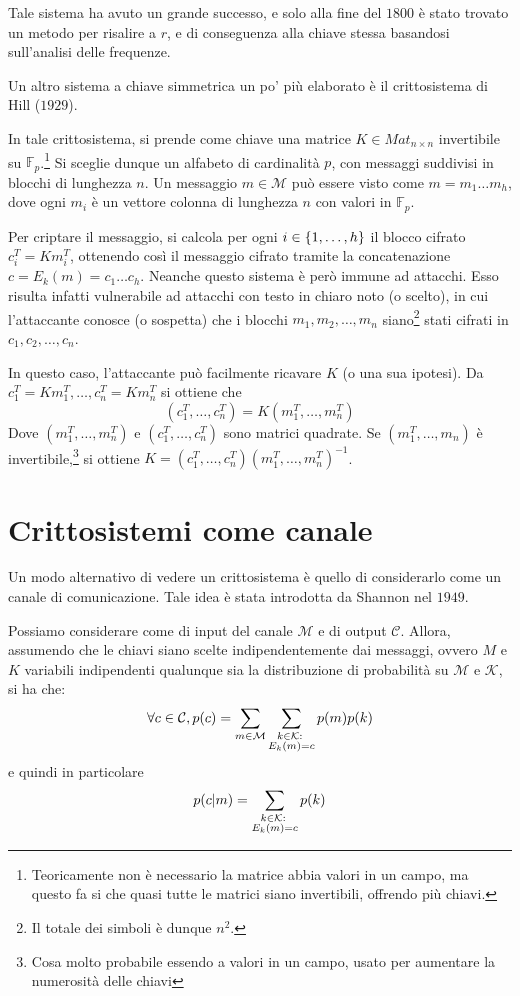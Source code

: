 Tale sistema ha avuto un grande successo, e solo alla fine del \(1800\) è stato trovato un metodo per risalire a \(r\), e di conseguenza alla chiave stessa basandosi sull'analisi delle frequenze.

Un altro sistema a chiave simmetrica un po' più elaborato è il crittosistema di Hill (\(1929\)).

In tale crittosistema, si prende come chiave una matrice \(K \in Mat_{n\times n}\) invertibile su \(\mathbb{F}_p\).\footnote{Teoricamente non è necessario la matrice abbia valori in un campo, ma questo fa si che quasi tutte le matrici siano invertibili, offrendo più chiavi.}
Si sceglie dunque un alfabeto di cardinalità \(p\), con messaggi suddivisi in blocchi di lunghezza \(n\). Un messaggio \(m\in\mathcal{M}\) può essere visto come \(m = m_1\ldots m_h\), dove ogni \(m_i\) è un vettore colonna di lunghezza \(n\) con valori in \(\mathbb{F}_p\).

Per criptare il messaggio, si calcola per ogni \(i \in \set{1,\ldots, h}\) il blocco cifrato \(c_i^T = K m_i^T\), ottenendo così il messaggio cifrato tramite la concatenazione \(c = E_{k}(m) = c_1\ldots c_h\).
Neanche questo sistema è però immune ad attacchi. Esso risulta infatti vulnerabile ad attacchi con testo in chiaro noto (o scelto), in cui l'attaccante conosce (o sospetta) che i blocchi \(m_1, m_2, \ldots, m_n\) siano\footnote{Il totale dei simboli è dunque \(n^2\).} stati cifrati in \(c_1, c_2, \ldots, c_n\).

In questo caso, l'attaccante può facilmente ricavare \(K\) (o una sua ipotesi).
Da \(c_1^T = K m_1^T, \ldots , c_n^T = K m_n^T\) si ottiene che
\[(c_1^T,\ldots, c_n^T) = K (m_1^T, \ldots, m_n^T)\]
Dove \((m_1^T, \ldots, m_n^T)\) e \((c_1^T,\ldots, c_n^T)\) sono matrici quadrate.
Se \((m_1^T, \ldots, m_n)\) è invertibile,\footnote{Cosa molto probabile essendo a valori in un campo, usato per aumentare la numerosità delle chiavi} si ottiene \(K = (c_1^T,\ldots, c_n^T){(m_1^T, \ldots, m_n^T)}^{-1}\).

\section{Crittosistemi come canale}
Un modo alternativo di vedere un crittosistema è quello di considerarlo come un canale di comunicazione.
Tale idea è stata introdotta da Shannon nel \(1949\).

Possiamo considerare come  di input del canale \(\mathcal{M}\) e di output \(\mathcal{C}\).
Allora, assumendo che le chiavi siano scelte indipendentemente dai messaggi, ovvero \(M\) e \(K\) variabili indipendenti qualunque sia la distribuzione di probabilità su \(\mathcal{M}\) e \(\mathcal{K}\), si ha che:
\[\forall c \in \mathcal{C}, p(c) = \sum_{m\in\mathcal{M}} \sum_{\substack{k \in \mathcal{K} :\;\\ E_k(m)=c}} p(m) p(k)\]
e quindi in particolare
\[p(c|m) = \sum_{\substack{k \in \mathcal{K} :\;\\ E_k(m)=c}} p(k)\]

